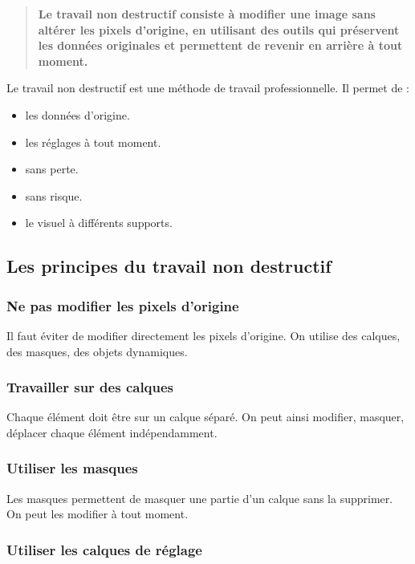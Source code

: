 \begin{quote}
\textbf{Le travail non destructif consiste à modifier une image sans altérer les pixels d'origine, en utilisant des outils qui préservent les données originales et permettent de revenir en arrière à tout moment.}
\end{quote}

Le travail non destructif est une méthode de travail professionnelle. Il permet de :

\begin{itemize}
    \item {} les données d'origine.
    \item {} les réglages à tout moment.
    \item {} sans perte.
    \item {} sans risque.
    \item {} le visuel à différents supports.
\end{itemize}

\subsection{Les principes du travail non destructif}

\subsubsection{Ne pas modifier les pixels d'origine}

Il faut éviter de modifier directement les pixels d'origine. On utilise des calques, des masques, des objets dynamiques.

\subsubsection{Travailler sur des calques}

Chaque élément doit être sur un calque séparé. On peut ainsi modifier, masquer, déplacer chaque élément indépendamment.

\subsubsection{Utiliser les masques}

Les masques permettent de masquer une partie d'un calque sans la supprimer. On peut les modifier à tout moment.

\subsubsection{Utiliser les calques de réglage}


